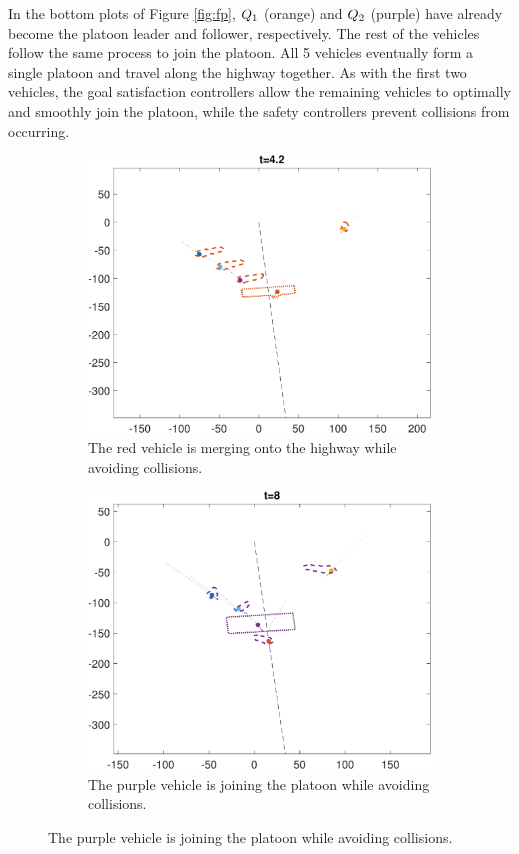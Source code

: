 In the bottom plots of Figure \ref{fig:fp}, $Q_{1}$ (orange) and $Q_{2}$ (purple) have already become the platoon leader and follower, respectively. The rest of the vehicles follow the same process to join the platoon. All 5 vehicles eventually form a single platoon and travel along the highway together. As with the first two vehicles, the goal satisfaction controllers allow the remaining vehicles to optimally and smoothly join the platoon, while the safety controllers prevent collisions from occurring.

\begin{figure} 
    \centering
    \begin{subfigure}[t]{0.45\columnwidth} \label{subfig:fp_43}
        \includegraphics[width=\columnwidth]{fig/fp_43}
        \caption{The red vehicle is merging onto the highway while avoiding collisions.}
    \end{subfigure}
    \begin{subfigure}[t]{0.45\columnwidth} \label{subfig:fp_81}
        \includegraphics[width=\columnwidth]{fig/fp_81}
        \caption{The purple vehicle is joining the platoon while avoiding collisions.}
    \end{subfigure}


\end{figure}
